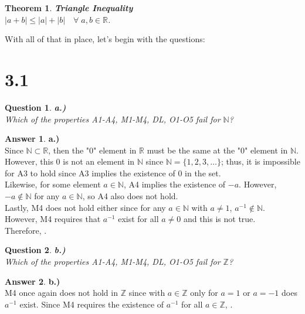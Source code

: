 \documentclass[10pt,a4paper]{article}
\newtheorem*{question*}{Question}
\newtheorem*{theorem*}{Theorem}
\theoremstyle{definition}
\newtheorem*{answer*}{Answer}
\begin{document}
\begin{theorem*}{\textbf{Triangle Inequality}}
\\$|a + b| \leq |a| + |b| \quad \forall \; a,b \in \mathbb{R}$.
\end{theorem*}
{$ $}
\\With all of that in place, let's begin with the questions:

\section*{3.1}
\begin{question*}{\textbf{a.)}}
\\Which of the properties {\normalfont A1-A4, M1-M4, DL, O1-O5} fail for $\mathbb{N}$?
\end{question*}

\begin{answer*}{\textbf{a.)}}
\\Since $\mathbb{N} \subset \mathbb{R}$, then the "$0$" element in $\mathbb{R}$ must be the same at the "$0$" element in $\mathbb{N}$. However, this $0$ is not an element in $\mathbb{N}$ since $\mathbb{N} = \{1,2,3,\ldots\}$; thus, it is impossible for A3 to hold since A3 implies the existence of 0 in the set.
\\Likewise, for some element $a \in \mathbb{N}$, A4 implies the existence of $-a$. However, $-a \notin \mathbb{N}$ for any $a \in \mathbb{N}$, so A4 also does not hold.
\\Lastly, M4 does not hold either since for any $a \in \mathbb{N}$ with $a \neq 1$, $a^{-1} \notin \mathbb{N}$. However, M4 requires that $a^{-1}$ exist for all $a \neq 0$ and this is not true. 
\\Therefore, .

\end{answer*}

\begin{question*}{\textbf{b.)}}
\\Which of the properties {\normalfont A1-A4, M1-M4, DL, O1-O5} fail for $\mathbb{Z}$?
\end{question*}

\begin{answer*}{\textbf{b.)}}
\\M4 once again does not hold in $\mathbb{Z}$ since with $a \in \mathbb{Z}$ only for $a = 1$ or $a = -1$ does $a^{-1}$ exist. Since M4 requires the existence of $a^{-1}$ for all $a \in \mathbb{Z}$, .
\end{answer*}
\end{document}
